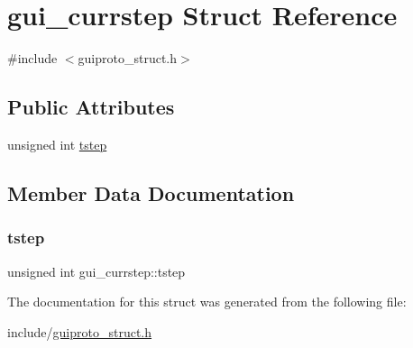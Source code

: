 \hypertarget{structgui__currstep}{}\section{gui\+\_\+currstep Struct Reference}
\label{structgui__currstep}


{\ttfamily \#include $<$guiproto\+\_\+struct.\+h$>$}

\subsection*{Public Attributes}
\begin{DoxyCompactItemize}
\item 
unsigned int \mbox{\hyperlink{structgui__currstep_ab1c1f4e9b69e7684a69c68cad26ceef0}{tstep}}
\end{DoxyCompactItemize}


\subsection{Member Data Documentation}
\mbox{\label{structgui__currstep_ab1c1f4e9b69e7684a69c68cad26ceef0}} 
\subsubsection{\texorpdfstring{tstep}{tstep}}
{\footnotesize\ttfamily unsigned int gui\+\_\+currstep\+::tstep}



The documentation for this struct was generated from the following file\+:\begin{DoxyCompactItemize}
\item 
include/\mbox{\hyperlink{guiproto__struct_8h}{guiproto\+\_\+struct.\+h}}\end{DoxyCompactItemize}

